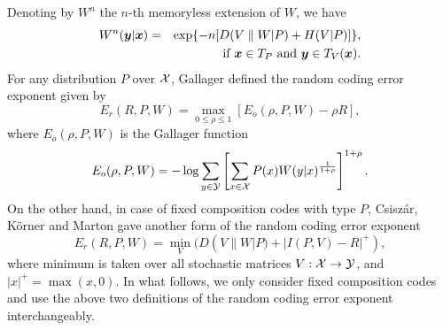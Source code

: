 Denoting by $W^n$ the $n$-th memoryless extension of $W$, we have
\begin{eqnarray}
 W^n(\mbox{\boldmath{$y$}}|\mbox{\boldmath{$x$}})&=&\exp\{-n[D(V\parallel W|P)+H(V|P)]\},\nonumber \\
 && \quad \mbox{if $\mbox{\boldmath{$x$}}\in T_P$ and $\mbox{\boldmath{$y$}} \in T_V(\mbox{\boldmath{$x$}})$}.
\label{w}
\end{eqnarray}
%
For any distribution $P$ over ${\cal X}$, 
Gallager defined the random coding error exponent\cite{ga} given by
\begin{equation}
E_r(R,P,W) = \max_{0\le \rho \le 1}\left[E_o(\rho,P,W)
 -\rho R \right],
\label{erg}
\end{equation}
where $E_o(\rho,P,W)$ is the Gallager function
\begin{equation}
 E_o(\rho,P,W)=- \log \sum_{y \in {\cal Y}}\left[ \sum_{x \in {\cal X}}P(x)
W(y|x)^{\frac{1}{1+ \rho}} \right]^{1+ \rho}.
\label{gaf}
\end{equation}
On the other hand, in case of fixed composition codes
with type $P$, Csisz\'ar, K\"orner and Marton gave another form of
the random coding error exponent\cite{ck}
\begin{equation}
 E_r(R,P,W) = \min_{V} (D(V\parallel W|P)+|I(P,V)-R|^+),
\label{erckm}
\end{equation}
where minimum is taken over all stochastic matrices $V:{\cal X}\rightarrow{\cal Y}$,
and $|x|^+=\max(x,0)$. 
In what follows, we only consider fixed composition codes
and use the above two definitions of the random coding error exponent
interchangeably.


